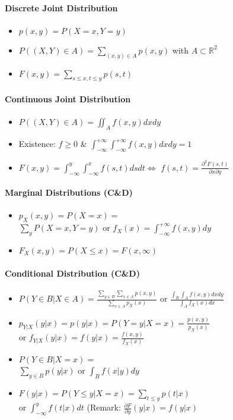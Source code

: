 \documentclass[paper=a4,fontsize=8pt,pagesize,DIV=calc]{scrartcl}
\newcounter{row}
\begin{document}
\begin{multicols}{3}
\paragraph{Discrete Joint Distribution}
\begin{itemize}
\item $p(x,y)=P(X=x,Y=y)$
\item $P((X,Y)\in A)=\sum_{(x,y)\in A} p(x,y)$ with $A\subset\mathbb{R}^2$
\item $F(x,y)=\sum_{s\leq x, t\leq y} p(s,t)$
\end{itemize}
\paragraph{Continuous Joint Distribution}
\begin{itemize}
\item $P((X,Y)\in A)=\iint_Af(x,y)dxdy$
\item Existence: $f\geq 0$ \& $\int^{+\infty}_{-\infty}\int^{+\infty}_{-\infty} f(x,y)dxdy=1$
\item $F(x,y)=\int^{y}_{-\infty}\int^{x}_{-\infty} f(s,t)dsdt \Leftrightarrow$ $f(s,t)=\frac{\partial^2F(s,t)}{\partial x\partial y}$
\end{itemize}
\paragraph{Marginal Distributions (C\&D)}
\begin{itemize}
\item $p_X(x,y)=P(X=x)=$\\
$\sum_y P(X=x,Y=y)$ or $f_X(x)=\int^{+\infty}_{-\infty}f(x,y)dy$
\item $F_X(x,y)=P(X\leq x)=F(x,\infty)$
\end{itemize}
\paragraph{Conditional Distribution (C\&D)}
\begin{itemize}
\item $P(Y\in B|X\in A)=\frac{\sum_{y\in B} \sum_{x\in A}p(x,y)}{\sum_{x\in A}p_X(x)}$ or $ \frac{\int_B \int_A f(x,y)dx dy}{\int_A f_X(x)dx}$
\item $p_{Y|X}(y|x)=p(y|x)=P(Y=y|X=x)=\frac{p(x,y)}{p_X(x)}$\\
or $f_{Y|X}(y|x)=f(y|x)=\frac{f(x,y)}{f_X(x)}$
\item $P(Y\in B|X=x)=$\\ 
$ \sum_{y\in B} p(y|x)$ or $\int_B f(x|y)dy$
\item $F(y|x)=P(Y\leq y|X=x)= \sum_{t\leq y} p(t|x)$\\ or $\int_{-\infty}^y f(t|x)dt$ (Remark: $\frac{\partial F}{\partial y}(y|x)=f(y|x)$
\end{itemize}

\end{multicols}
\end{document}
